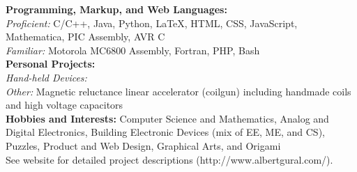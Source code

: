 \documentclass{article}
\newenvironment{changemargin}[2]{%
  \begin{list}{}{%
    \setlength{\topsep}{0pt}%
    \setlength{\leftmargin}{#1}%
    \setlength{\rightmargin}{#2}%
    \setlength{\listparindent}{\parindent}%
    \setlength{\itemindent}{\parindent}%
    \setlength{\parsep}{\parskip}%
  }%
  \item[]}{\end{list}
}
\newenvironment{body} {
	\vspace*{-16pt}
	\begin{changemargin}{-0.25in}{-0.5in}
  }	
	{\end{changemargin}
}
\begin{document}
\begin{body}
	\vspace{14pt}
	\textbf{Programming, Markup, and Web Languages:} \\
	\textit{Proficient:} C/C++, Java, Python, \LaTeX, HTML, CSS, JavaScript, Mathematica, PIC Assembly, AVR C \\ 
	\textit{Familiar:} Motorola MC6800 Assembly, Fortran, PHP, Bash \\
	\medskip
	\textbf{Personal Projects:} \\
	\textit{Hand-held Devices:} \\
	\textit{Other:} Magnetic reluctance linear accelerator (coilgun) including handmade coils and high voltage capacitors \\
	\medskip
	\textbf{Hobbies and Interests:} Computer Science and Mathematics, Analog and Digital Electronics, Building Electronic Devices (mix of EE, ME, and CS), Puzzles, Product and Web Design, Graphical Arts, and Origami \\ See website for detailed project descriptions (http://www.albertgural.com/). \\
\end{body}

\smallskip
\end{document}
